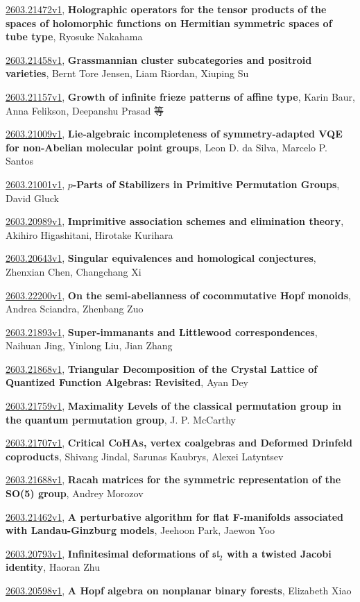 \documentclass[9pt, a4paper]{article}
\theoremstyle{plain}
\theoremstyle{definition}
\theoremstyle{remark}
\newcommand{\arxiv}[3]{\href{https://arxiv.org/abs/#1}{#1}, \textbf{\textcolor{arxivblue}{#2}}, #3}
\begin{document}
\arxiv{2603.21472v1}{Holographic operators for the tensor products of the spaces of holomorphic functions on Hermitian symmetric spaces of tube type}{Ryosuke Nakahama}

\arxiv{2603.21458v1}{Grassmannian cluster subcategories and positroid varieties}{Bernt Tore Jensen, Liam Riordan, Xiuping Su}

\arxiv{2603.21157v1}{Growth of infinite frieze patterns of affine type}{Karin Baur, Anna Felikson, Deepanshu Prasad 等}

\arxiv{2603.21009v1}{Lie-algebraic incompleteness of symmetry-adapted VQE for non-Abelian molecular point groups}{Leon D. da Silva, Marcelo P. Santos}

\arxiv{2603.21001v1}{$p$-Parts of Stabilizers in Primitive Permutation Groups}{David Gluck}

\arxiv{2603.20989v1}{Imprimitive association schemes and elimination theory}{Akihiro Higashitani, Hirotake Kurihara}

\arxiv{2603.20643v1}{Singular equivalences and homological conjectures}{Zhenxian Chen, Changchang Xi}

\arxiv{2603.22200v1}{On the semi-abelianness of cocommutative Hopf monoids}{Andrea Sciandra, Zhenbang Zuo}

\arxiv{2603.21893v1}{Super-immanants and Littlewood correspondences}{Naihuan Jing, Yinlong Liu, Jian Zhang}

\arxiv{2603.21868v1}{Triangular Decomposition of the Crystal Lattice of Quantized Function Algebras: Revisited}{Ayan Dey}

\arxiv{2603.21759v1}{Maximality Levels of the classical permutation group in the quantum permutation group}{J. P. McCarthy}

\arxiv{2603.21707v1}{Critical CoHAs, vertex coalgebras and Deformed Drinfeld coproducts}{Shivang Jindal, Sarunas Kaubrys, Alexei Latyntsev}

\arxiv{2603.21688v1}{Racah matrices for the symmetric representation of the SO(5) group}{Andrey Morozov}

\arxiv{2603.21462v1}{A perturbative algorithm for flat F-manifolds associated with Landau-Ginzburg models}{Jeehoon Park, Jaewon Yoo}

\arxiv{2603.20793v1}{Infinitesimal deformations of $\mathfrak{sl}_2$ with a twisted Jacobi identity}{Haoran Zhu}

\arxiv{2603.20598v1}{A Hopf algebra on nonplanar binary forests}{Elizabeth Xiao}

\end{document}
